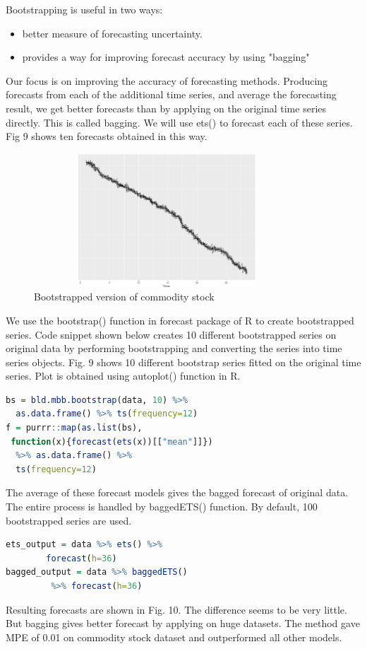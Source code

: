 \documentclass[runningheads]{llncs}
\begin{document}
Bootstrapping is useful in two ways:
\begin{itemize}
\item better measure of forecasting uncertainty.
\item provides a way for improving forecast accuracy by using "bagging"
\end{itemize}

Our focus is on improving the accuracy of forecasting methods. Producing forecasts from each of the additional time series, and average the forecasting result, we get better forecasts than by applying on the original time series directly. This is called bagging. We will use ets() to forecast each of these series. Fig 9 shows ten forecasts obtained in this way.

\begin{figure}
\centering
\includegraphics[scale=1,width=10cm,height=5cm]{BootstrappedSeries.png} 
\caption{Bootstrapped version of commodity stock}
\end{figure}

We use the bootstrap() function in forecast package of R to create bootstrapped series. Code snippet shown below creates 10 different bootstrapped series on original data by performing bootstrapping and converting the series into time series objects. Fig. 9 shows 10 different bootstrap series fitted on the original time series. Plot is obtained using autoplot() function in R.
\begin{lstlisting}[language=R]
bs = bld.mbb.bootstrap(data, 10) %>%
  as.data.frame() %>% ts(frequency=12)  
f = purrr::map(as.list(bs),
 function(x){forecast(ets(x))[["mean"]]})
  %>% as.data.frame() %>%
  ts(frequency=12)
\end{lstlisting}

The average of these forecast models gives the bagged forecast of original data. The entire process is handled by baggedETS() function. By default, 100 bootstrapped series are used.

\begin{lstlisting}[language=R]
ets_output = data %>% ets() %>% 
		forecast(h=36)
bagged_output = data %>% baggedETS()
		 %>% forecast(h=36)
\end{lstlisting}
Resulting forecasts are shown in Fig. 10. The difference seems to be very little. But bagging gives better forecast by applying on huge datasets. The method gave MPE of 0.01 on commodity stock dataset and outperformed all other models.
\end{document}
